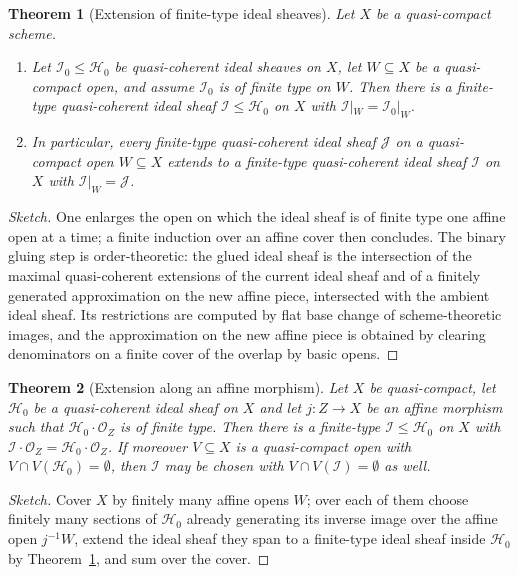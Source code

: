 \documentclass[11pt,a4paper]{article}
\theoremstyle{plain}
\newtheorem{theorem}{Theorem}[section]
\theoremstyle{definition}
\theoremstyle{remark}
\newcommand{\sO}{\mathcal{O}}
\newcommand{\sH}{\mathcal{H}}
\newcommand{\sI}{\mathcal{I}}
\newcommand{\sJ}{\mathcal{J}}
\begin{document}
\begin{theorem}[Extension of finite-type ideal sheaves]
\label{thm:01PF}
Let $X$ be a quasi-compact scheme.
\begin{enumerate}[label=\textup{(\roman*)}, itemsep=1pt]
\item Let $\sI_0\le\sH_0$ be quasi-coherent ideal sheaves on $X$, let
      $W\subseteq X$ be a quasi-compact open, and assume $\sI_0$ is of finite
      type on $W$. Then there is a finite-type quasi-coherent ideal sheaf
      $\sI\le\sH_0$ on $X$ with $\sI|_W=\sI_0|_W$.
\item In particular, every finite-type quasi-coherent ideal sheaf $\sJ$ on a
      quasi-compact open $W\subseteq X$ extends to a finite-type quasi-coherent
      ideal sheaf $\sI$ on $X$ with $\sI|_W=\sJ$.
\end{enumerate}
\end{theorem}

\begin{proof}[Sketch]
One enlarges the open on which the ideal sheaf is of finite type one affine
open at a time; a finite induction over an affine cover then concludes. The
binary gluing step is order-theoretic: the glued ideal sheaf is the
intersection of the maximal quasi-coherent extensions of the current ideal
sheaf and of a finitely generated approximation on the new affine piece,
intersected with the ambient ideal sheaf. Its restrictions are computed by flat
base change of scheme-theoretic images, and the approximation on the new affine
piece is obtained by clearing denominators on a finite cover of the overlap by
basic opens.
\end{proof}

\begin{theorem}[Extension along an affine morphism]
\label{thm:01PF-affine}
Let $X$ be quasi-compact, let $\sH_0$ be a quasi-coherent ideal sheaf on $X$
and let $j\colon Z\to X$ be an affine morphism such that $\sH_0\cdot\sO_Z$ is
of finite type. Then there is a finite-type $\sI\le\sH_0$ on $X$ with
$\sI\cdot\sO_Z=\sH_0\cdot\sO_Z$. If moreover $V\subseteq X$ is a quasi-compact
open with $V\cap V(\sH_0)=\emptyset$, then $\sI$ may be chosen with
$V\cap V(\sI)=\emptyset$ as well.
\end{theorem}

\begin{proof}[Sketch]
Cover $X$ by finitely many affine opens $W$; over each of them choose finitely
many sections of $\sH_0$ already generating its inverse image over the affine
open $j^{-1}W$, extend the ideal sheaf they span to a finite-type ideal sheaf
inside $\sH_0$ by Theorem~\ref{thm:01PF}, and sum over the cover.
\end{proof}
\end{document}
